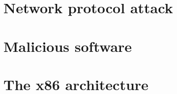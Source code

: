 \documentclass[12pt, a4paper]{report}
\begin{document}
    \chapter{Network protocol attack}
    
    
    
    

    \chapter{Malicious software}
    
    
    
    
    
    
    
    \appendix
    \chapter{The x86 architecture}
    
    
     
     
\end{document}
